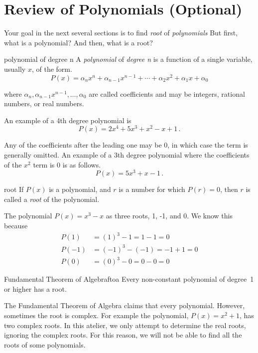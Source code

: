 \section{Review of Polynomials (Optional)}
\label{sec.general}

Your goal in the next several sections is to find \emph{root} of
\emph{polynomials} But first, what is a polynomial? And then, what is
a root?

\begin{definition}{polynomial of degree n}{}
  A \emph{polynomial} of \emph{degree n} is a function of a single
  variable, usually $x$, of the form.
  \[P(x) = \alpha_n x^n + \alpha_{n-1} x^{n-1} + \cdots + \alpha_2 x^2 + \alpha_1 x + \alpha_0 \]

  where $\alpha_n, \alpha_{n-1} x^{n-1}, \ldots, \alpha_0$ are called
  coefficients and may be integers, rational numbers, or real numbers.
\end{definition}

An example of a 4th degree polynomial is
\[P(x) = 2 x^4 + 5 x^3 + x^2 - x + 1\,.\]


Any of the coefficients after the leading one may be 0, in which case
the term is generally omitted.  An example of a 3th degree polynomial
where the coefficients of the $x^2$ term is 0 is as follows.
\[P(x) = 5 x^3 + x - 1\,.\]

\begin{definition}{root}{}
  If $P(x)$ is a polynomial, and $r$ is a number for which $P(r)=0$,
  then $r$ is called a \emph{root} of the polynomial.
\end{definition}

The polynomial $P(x) = x^3 - x$ as three roots, 1, -1, and 0.  We know
this because
\begin{align*}
  P(1) &= (1)^3 - 1 
  = 1 - 1 
  = 0\\[3pt]
  P(-1) &= (-1)^3 - (-1) 
  = -1 + 1 
  = 0\\[3pt]
  P(0) &= (0)^3 - 0
  = 0 - 0 
  = 0  
\end{align*}

\begin{theorem}{Fundamental Theorem of Algebra}{ftoa}
  Every non-constant polynomial of degree~1 or higher has a root.
\end{theorem}

The Fundamental Theorem of Algebra claims that every polynomial.
However, sometimes the root is complex.  For example the polynomial,
$P(x) = x^2 + 1$, has two complex roots.  In this atelier, we only
attempt to determine the real roots, ignoring the complex roots.  For
this reason, we will not be able to find all the roots of some
polynomials.

